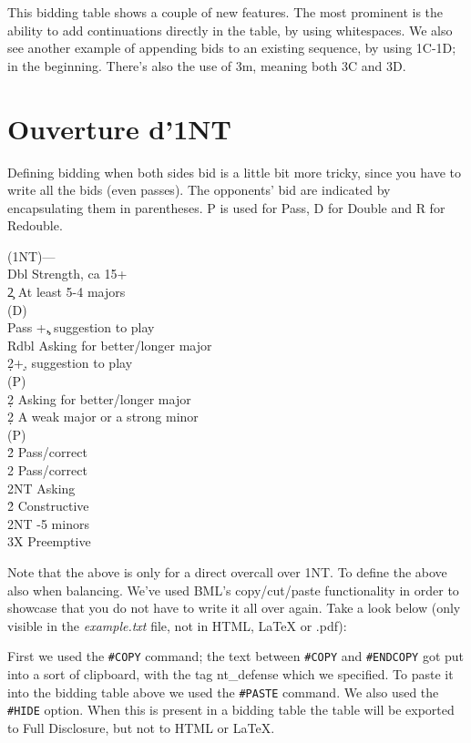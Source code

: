 \documentclass[a4paper]{article}
\begin{document}
This bidding table shows a couple of new features. The most
prominent is the ability to add continuations directly in the
table, by using whitespaces. We also see another example of
appending bids to an existing sequence, by using 1C-1D; in the
beginning. There's also the use of 3m, meaning both 3C and 3D.

\section{Ouverture d'1NT}

Defining bidding when both sides bid is a little bit more tricky,
since you have to write all the bids (even passes). The opponents'
bid are indicated by encapsulating them in parentheses. P is used
for Pass, D for Double and R for Redouble.

\begin{bidtable}
(1NT)---\\
Dbl \> Strength, ca 15+\\
2\c \> At least 5-4 majors\+\\
(D)\+\\
Pass +\c , suggestion to play\\
Rdbl \> Asking for better/longer major\\
2\d {}+\d , suggestion to play\-\\
(P)\+\\
2\d \> Asking for better/longer major\-\-\\
2\d \> A weak major or a strong minor\+\\
(P)\+\\
2\h \> Pass/correct\\
2\s \> Pass/correct\\
2NT \> Asking\-\-\\
2\h\s \> Constructive\\
2NT -5 minors\\
3X \> Preemptive
\end{bidtable}

Note that the above is only for a direct overcall over 1NT. To
define the above also when balancing. We've used BML's
copy/cut/paste functionality in order to showcase that you do not
have to write it all over again. Take a look below (only visible in
the \emph{example.txt} file, not in HTML, LaTeX or .pdf):

First we used the \texttt{\#COPY} command; the text between \texttt{\#COPY} and \texttt{\#ENDCOPY}
got put into a sort of clipboard, with the tag nt\_defense which we
specified. To paste it into the bidding table above we used
the \texttt{\#PASTE} command. We also used the \texttt{\#HIDE} option. When this is
present in a bidding table the table will be exported to Full
Disclosure, but not to HTML or LaTeX.
\end{document}

